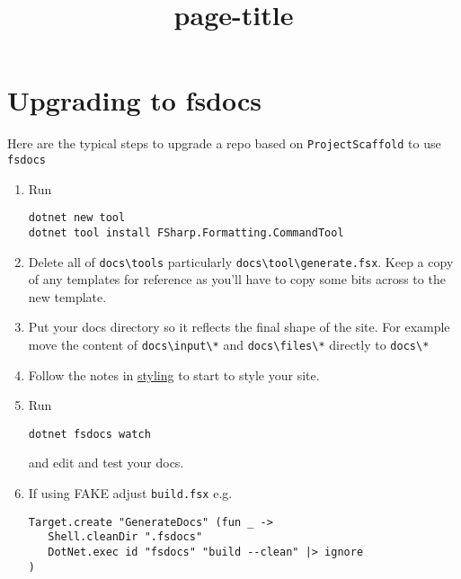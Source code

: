 \documentclass{article}
\title{{page-title}}
\date{}
\begin{document}
\maketitle

\section*{Upgrading to fsdocs}



Here are the typical steps to upgrade a repo based on \texttt{ProjectScaffold} to use \texttt{fsdocs}
\begin{enumerate}
\item 

Run
\begin{lstlisting}
dotnet new tool
dotnet tool install FSharp.Formatting.CommandTool

\end{lstlisting}

\item 

Delete all of \texttt{docs{\textbackslash}tools} particularly \texttt{docs{\textbackslash}tool{\textbackslash}generate.fsx}.  Keep a copy of any templates for reference as you'll have to copy some bits across to the new template.

\item 

Put your docs directory so it reflects the final shape of the site. For example move the content of \texttt{docs{\textbackslash}input{\textbackslash}*} and \texttt{docs{\textbackslash}files{\textbackslash}*} directly to \texttt{docs{\textbackslash}*}

\item 

Follow the notes in \href{styling.html}{styling} to start to style your site.

\item 

Run
\begin{lstlisting}
dotnet fsdocs watch

\end{lstlisting}


and edit and test your docs.

\item 

If using FAKE adjust \texttt{build.fsx} e.g.
\begin{lstlisting}
Target.create "GenerateDocs" (fun _ ->
   Shell.cleanDir ".fsdocs"
   DotNet.exec id "fsdocs" "build --clean" |> ignore
)


\end{lstlisting}
\end{enumerate}
\end{document}
